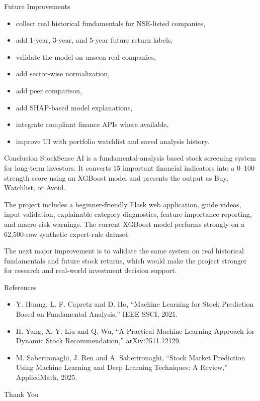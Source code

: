 \documentclass[aspectratio=169]{beamer}
\begin{document}
\begin{frame}{Future Improvements}
\begin{itemize}
  \item collect real historical fundamentals for NSE-listed companies,
  \item add 1-year, 3-year, and 5-year future return labels,
  \item validate the model on unseen real companies,
  \item add sector-wise normalization,
  \item add peer comparison,
  \item add SHAP-based model explanations,
  \item integrate compliant finance APIs where available,
  \item improve UI with portfolio watchlist and saved analysis history.
\end{itemize}
\end{frame}

\begin{frame}{Conclusion}
\justifying
StockSense AI is a fundamental-analysis based stock screening system for long-term investors. It converts 15 important financial indicators into a 0--100 strength score using an XGBoost model and presents the output as Buy, Watchlist, or Avoid.

\vspace{0.3cm}
The project includes a beginner-friendly Flask web application, guide videos, input validation, explainable category diagnostics, feature-importance reporting, and macro-risk warnings. The current XGBoost model performs strongly on a 62,500-row synthetic expert-rule dataset.

\vspace{0.3cm}
The next major improvement is to validate the same system on real historical fundamentals and future stock returns, which would make the project stronger for research and real-world investment decision support.
\end{frame}

\begin{frame}{References}
\footnotesize
\begin{itemize}
  \item Y. Huang, L. F. Capretz and D. Ho, ``Machine Learning for Stock Prediction Based on Fundamental Analysis,'' IEEE SSCI, 2021.
  \item H. Yang, X.-Y. Liu and Q. Wu, ``A Practical Machine Learning Approach for Dynamic Stock Recommendation,'' arXiv:2511.12129.
  \item M. Saberironaghi, J. Ren and A. Saberironaghi, ``Stock Market Prediction Using Machine Learning and Deep Learning Techniques: A Review,'' AppliedMath, 2025.
\end{itemize}
\end{frame}

\begin{frame}
  \centering
  \Huge Thank You
\end{frame}
\end{document}
